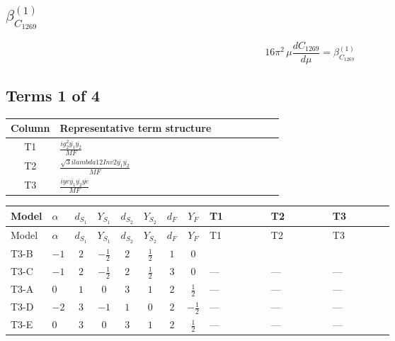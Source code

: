 \documentclass[8pt]{article}
\begin{document}
\begin{landscape}
\section*{$\beta_{C_{1269}}^{(1)}$}
\[16\pi^2\,\mu\frac{d C_{1269}}{d\mu}=\beta_{C_{1269}}^{(1)}\]
\subsection*{Terms 1 of 4}
\begin{center}
\begin{tabular}{@{}c >{\raggedright\arraybackslash}p{0.82\linewidth}@{}}
\toprule
Column & Representative term structure \\
\midrule
T1 & \(\displaystyle \frac{i g_{2}^{2} \overline{y_{1}} \overline{y_{2}}}{MF}\) \\
\midrule
T2 & \(\displaystyle \frac{\sqrt{3} i lambda12Inv2 \overline{y_{1}} \overline{y_{2}}}{MF}\) \\
\midrule
T3 & \(\displaystyle \frac{i ye \overline{y_{1}} \overline{y_{2}} \overline{ye}}{MF}\) \\
\midrule
\bottomrule
\end{tabular}
\end{center}
\smallskip
\tiny
\begin{longtable}{@{}llcccccc >{\raggedright\arraybackslash}p{0.21\linewidth} >{\raggedright\arraybackslash}p{0.21\linewidth} >{\raggedright\arraybackslash}p{0.21\linewidth}@{}}
\toprule
Model & $\alpha$ & $d_{S_1}$ & $Y_{S_1}$ & $d_{S_2}$ & $Y_{S_2}$ & $d_F$ & $Y_F$ & T1 & T2 & T3 \\
\midrule
\endfirsthead
\toprule
Model & $\alpha$ & $d_{S_1}$ & $Y_{S_1}$ & $d_{S_2}$ & $Y_{S_2}$ & $d_F$ & $Y_F$ & T1 & T2 & T3 \\
\midrule
\endhead
T3-B & $-1$ & $2$ & $-\frac{1}{2}$ & $2$ & $\frac{1}{2}$ & $1$ & $0$ & \scriptsize\adjustbox{max width=\linewidth}{$\begin{gathered} - \frac{3 i g_{2}^{2} \overline{y_{1}} \overline{y_{2}}}{8 MF}\end{gathered}$} & \scriptsize\adjustbox{max width=\linewidth}{$\begin{gathered} - \frac{\sqrt{3} i lambda12Inv2 \overline{y_{1}} \overline{y_{2}}}{6 MF}\end{gathered}$} & \scriptsize\adjustbox{max width=\linewidth}{$\begin{gathered} \frac{i ye \overline{y_{1}} \overline{y_{2}} \overline{ye}}{8 MF}\end{gathered}$} \\
\midrule
T3-C & $-1$ & $2$ & $-\frac{1}{2}$ & $2$ & $\frac{1}{2}$ & $3$ & $0$ & --- & --- & --- \\
\midrule
T3-A & $0$ & $1$ & $0$ & $3$ & $1$ & $2$ & $\frac{1}{2}$ & --- & --- & --- \\
\midrule
T3-D & $-2$ & $3$ & $-1$ & $1$ & $0$ & $2$ & $-\frac{1}{2}$ & --- & --- & --- \\
\midrule
T3-E & $0$ & $3$ & $0$ & $3$ & $1$ & $2$ & $\frac{1}{2}$ & --- & --- & --- \\
\midrule
\bottomrule
\end{longtable}
\clearpage

\end{landscape}
\end{document}
